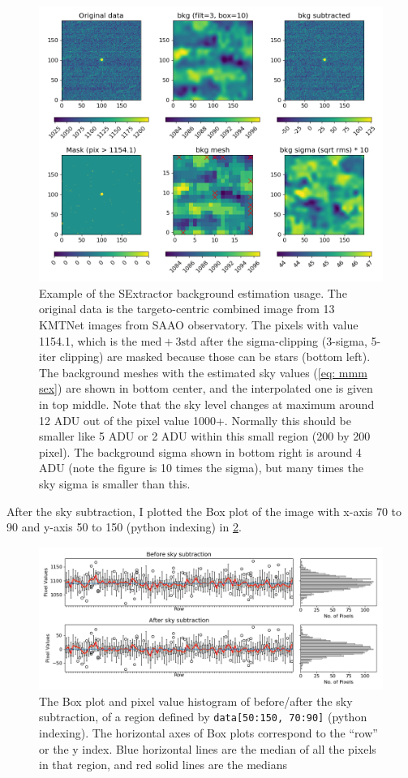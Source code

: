 \begin{figure}[ht!]
\centering
\includegraphics[width=\linewidth]{figs/sex_bkg_01}
\caption{Example of the SExtractor background estimation usage. The original data is the targeto-centric combined image from 13 KMTNet images from SAAO observatory. The pixels with value 1154.1, which is the $ \mathrm{med} + 3\mathrm{std} $ after the sigma-clipping (3-sigma, 5-iter clipping) are masked because those can be stars (bottom left). The background meshes with the estimated sky values (\cref{eq: mmm sex}) are shown in bottom center, and the interpolated one is given in top middle. Note that the sky level changes at maximum around 12 ADU out of the pixel value 1000+. Normally this should be smaller like 5 ADU or 2 ADU within this small region (200 by 200 pixel). The background sigma shown in bottom right is around 4 ADU (note the figure is 10 times the sigma), but many times the sky sigma is smaller than this.}
\label{fig:sexbkg01}
\end{figure}

After the sky subtraction, I plotted the Box plot of the image with x-axis 70 to 90 and y-axis 50 to 150 (python indexing) in \cref{fig:sexbkg02skyhist}.

\begin{figure}[ht!]
\centering
\includegraphics[width=\linewidth]{figs/sex_bkg_02_skyhist}
\caption{The Box plot and pixel value histogram of before/after the sky subtraction, of a region defined by \texttt{data[50:150, 70:90]} (python indexing). The horizontal axes of Box plots correspond to the ``row'' or the y index. Blue horizontal lines are the median of all the pixels in that region, and red solid lines are the medians }
\label{fig:sexbkg02skyhist}
\end{figure}

